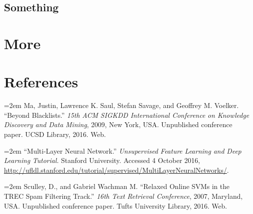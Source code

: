 \documentclass[cs]{hmcclinic}
\begin{document}
\section{Something}


\chapter{More}


\chapter{References}

\hangindent=2em
Ma, Justin, Lawrence K. Saul, Stefan Savage, and Geoffrey M. Voelker. ``Beyond Blacklists.'' \textit{15th ACM SIGKDD International Conference on Knowledge Discovery and Data Mining}, 2009, New York, USA. Unpublished conference paper. UCSD Library, 2016. Web.

\hangindent=2em
\noindent ``Multi-Layer Neural Network.'' \textit{Unsupervised Feature Learning and Deep Learning Tutorial.} Stanford University. Accessed 4 October 2016, \url{http://ufldl.stanford.edu/tutorial/supervised/MultiLayerNeuralNetworks/}.

\hangindent=2em
\noindent Sculley, D., and Gabriel Wachman M. ``Relaxed Online SVMs in the TREC Spam Filtering Track.'' \textit{16th Text Retrieval Conference}, 2007, Maryland, USA. Unpublished conference paper. Tufts University Library, 2016. Web.

\newpage






\end{document}
